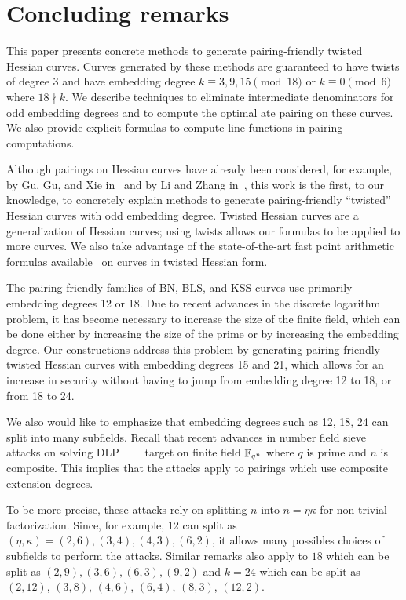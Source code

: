 \section{Concluding remarks}
\label{sec:conclude}

This paper presents concrete methods to generate pairing-friendly twisted Hessian curves.
Curves generated by these methods are guaranteed to have twists of degree $3$
and have embedding degree
$k \equiv 3,9,15 \pmod{18}$ or
$k \equiv 0 \pmod{6}$ where $18 \nmid k$.
We describe techniques to eliminate intermediate denominators for odd embedding degrees
and to compute the optimal ate pairing on these curves.
We also provide explicit formulas to compute line functions in pairing computations.

Although pairings on Hessian curves have already been considered,
for example, by Gu, Gu, and Xie in~\cite{2010/Gu} and by Li and Zhang in~\cite{2012/Li},
this work is the first, to our knowledge, to concretely explain methods to generate
pairing-friendly ``twisted'' Hessian curves with odd embedding degree.
Twisted Hessian curves are a generalization of Hessian curves; using twists allows our formulas to be applied to more curves.
We also take advantage of the state-of-the-art fast point arithmetic formulas available~\cite{2015/hessian}
on curves in twisted Hessian form.

The pairing-friendly families of BN, BLS, and KSS curves use primarily embedding degrees 12 or 18.
Due to recent advances in the discrete logarithm problem, it has become necessary to increase the size of the finite field,
which can be done either by increasing the size of the prime or by increasing the embedding degree.
Our constructions address this problem by generating pairing-friendly twisted Hessian curves with embedding degrees 15 and 21,
which allows for an increase in security without having to jump from embedding degree 12 to 18, or from 18 to 24.

We also would like to emphasize that embedding degrees such as 12, 18, 24 can split into many subfields.
Recall that recent advances in number field sieve attacks on solving DLP~\cite{2016/conjugate}~\cite{2016/SS}~\cite{2016/KB}~\cite{2017/KJ}
target on finite field $\mathbb{F}_{q^n}$ where $q$ is prime and $n$ is composite.
This implies that the attacks apply to pairings which use composite extension degrees.

To be more precise, these attacks rely on splitting $n$ into $n = \eta \kappa$ for non-trivial factorization.
Since, for example, 12 can split as $(\eta,\kappa) = (2,6), (3,4), (4,3), (6,2)$,
it allows many possibles choices of subfields to perform the attacks.
Similar remarks also apply to
$18$ which can be split as $(2,9), (3,6), (6,3), (9,2)$
and
$k = 24$ which can be split as $(2,12)$, $(3,8)$, $(4,6)$, $(6,4)$, $(8,3)$, $(12,2)$.

